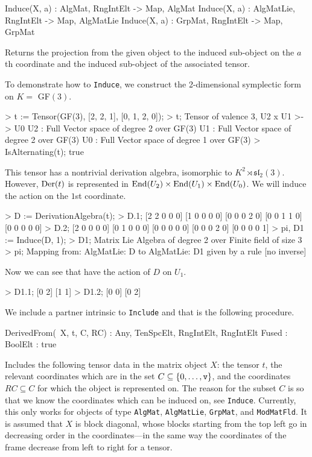 \begin{intrinsics}
Induce(X, a) : AlgMat, RngIntElt -> Map, AlgMat
Induce(X, a) : AlgMatLie, RngIntElt -> Map, AlgMatLie
Induce(X, a) : GrpMat, RngIntElt -> Map, GrpMat
\end{intrinsics}

Returns the projection from the given object to the induced sub-object on the
$a$th coordinate and the induced sub-object of the associated tensor.

\begin{example}[Inducing]

To demonstrate how to \texttt{Induce}, we construct the 2-dimensional symplectic
form on $K =$ GF$(3)$. 
\begin{code}
> t := Tensor(GF(3), [2, 2, 1], [0, 1, 2, 0]);
> t;
Tensor of valence 3, U2 x U1 >-> U0
U2 : Full Vector space of degree 2 over GF(3)
U1 : Full Vector space of degree 2 over GF(3)
U0 : Full Vector space of degree 1 over GF(3)
> IsAlternating(t);
true
\end{code}

This tensor has a nontrivial derivation algebra, isomorphic to $K^2\rtimes
\mathfrak{sl}_2(3)$. However, $\operatorname{Der}(t)$ is represented in
$\operatorname{End}(U_2)\times\operatorname{End}(U_1)\times \operatorname{End}(U_0)$. We will induce the action on the
$1$st coordinate.
\begin{code}
> D := DerivationAlgebra(t);
> D.1;
[2 2 0 0 0]
[1 0 0 0 0]
[0 0 0 2 0]
[0 0 1 1 0]
[0 0 0 0 0]
> D.2;
[2 0 0 0 0]
[0 1 0 0 0]
[0 0 0 0 0]
[0 0 0 2 0]
[0 0 0 0 1]
> pi, D1 := Induce(D, 1);
> D1;
Matrix Lie Algebra of degree 2 over Finite field of size 3
> pi;
Mapping from: AlgMatLie: D to AlgMatLie: D1 given by a rule [no inverse]
\end{code}

Now we can see that have the action of $D$ on $U_1$.
\begin{code}
> D1.1;
[0 2]
[1 1]
> D1.2;
[0 0]
[0 2]
\end{code}
\end{example}

We include a partner intrinsic to \texttt{Include} and that is the following procedure.

\begin{intrinsics}
DerivedFrom(~X, t, C, RC) : Any, TenSpcElt, {RngIntElt}, {RngIntElt}
    Fused : BoolElt : true
\end{intrinsics}

Includes the following tensor data in the matrix object $X$: the tensor $t$, the
relevant coordinates which are in the set $C\subseteq \{0,\dots,\operatorname{\mathtt{v}}\}$, and the
coordinates $RC\subseteq C$ for which the object is represented on. The reason
for the subset $C$ is so that we know the coordinates which can be induced on,
see \texttt{Induce}. Currently, this only works for objects of type
\texttt{AlgMat}, \texttt{AlgMatLie}, \texttt{GrpMat}, and \texttt{ModMatFld}. It
is assumed that $X$ is block diagonal, whose blocks starting from the top left
go in decreasing order in the coordinates---in the same way the coordinates of
the frame decrease from left to right for a tensor. 

